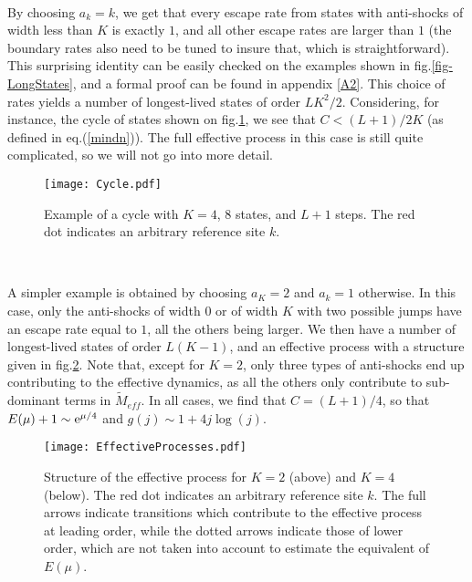 \documentclass[aps,pre,onecolumn,showpacs,showkeys,a4paper]{revtex4-1}
\begin{document}
~

By choosing $a_k=k$, we get that every escape rate from states with anti-shocks of width less than $K$ is exactly $1$, and all other escape rates are larger than $1$ (the boundary rates also need to be tuned to insure that, which is straightforward). This surprising identity can be easily checked on the examples shown in fig.\ref{fig-LongStates}, and a formal proof can be found in appendix \ref{A2}. This choice of rates yields a number of longest-lived states of order $LK^2/2$. Considering, for instance, the cycle of states shown on fig.\ref{fig-Cycle}, we see that $C<(L+1)/2K$ (as defined in eq.(\ref{mindn})). The full effective process in this case is still quite complicated, so we will not go into more detail.



 \begin{figure}[ht]
\begin{center}
 \texttt{[image: Cycle.pdf]}
  \caption{Example of a cycle with $K=4$, $8$ states, and $L+1$ steps. The red dot indicates an arbitrary reference site $k$.}
\label{fig-Cycle}
 \end{center}
 \end{figure}

~

A simpler example is obtained by choosing $a_K=2$ and $a_k=1$ otherwise. In this case, only the anti-shocks of width $0$ or of width $K$ with two possible jumps have an escape rate equal to $1$, all the others being larger. We then have a number of longest-lived states of order $L(K-1)$, and an effective process with a structure given in fig.\ref{fig-Effective}. Note that, except for $K=2$, only three types of anti-shocks end up contributing to the effective dynamics, as all the others only contribute to sub-dominant terms in $\tilde{M}_{eff}$. In all cases, we find that $C=(L+1)/4$, so that $E(\mu)+1\sim {\rm e}^{\mu/4}$ and $g(j)\sim1+4j\log(j)$.

 \begin{figure}[ht]
\begin{center}
 \texttt{[image: EffectiveProcesses.pdf]}
  \caption{Structure of the effective process for $K=2$ (above) and $K=4$ (below). The red dot indicates an arbitrary reference site $k$. The full arrows indicate transitions which contribute to the effective process at leading order, while the dotted arrows indicate those of lower order, which are not taken into account to estimate the equivalent of $E(\mu)$.}
\label{fig-Effective}
 \end{center}
 \end{figure}
\end{document}
